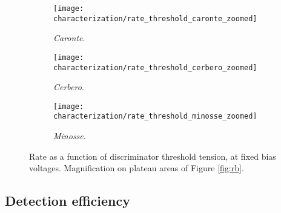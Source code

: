 \begin{figure}[!htp]
	\centering
	\begin{subfigure}{.5\linewidth}
		\centering
		\texttt{[image: characterization/rate\_threshold\_caronte\_zoomed]}
		\caption{\emph{Caronte}.} 
		\label{subfig:zoomed_caronte}
	\end{subfigure}\hfill
	\begin{subfigure}{.5\linewidth}
		\centering
		\texttt{[image: characterization/rate\_threshold\_cerbero\_zoomed]}
		\caption{\emph{Cerbero}.} 
		\label{subfig:zoomed_cerbero}
	\end{subfigure}\hfill
	\begin{subfigure}{\linewidth}
		\centering
		\texttt{[image: characterization/rate\_threshold\_minosse\_zoomed]}
		\caption{\emph{Minosse}.} 
		\label{subfig:zoomed_minosse}
	\end{subfigure}
	\caption{Rate as a function of discriminator threshold tension, at fixed bias voltages. Magnification on plateau areas of Figure \ref{fig:rb}.} 
	\label{fig:zoomed}
\end{figure}



\subsection{Detection efficiency} \label{sub:detection_eff}

